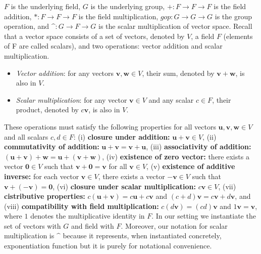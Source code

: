\documentclass[conference,compsoc]{IEEEtran}
\begin{document}
\noindent
 $F$ is the underlying field, $G$ is the underlying group,
 $+ : F \rightarrow F \rightarrow F$ is the field addition,
 $* : F \rightarrow F \rightarrow F$ is the field multiplication, 
 $gop : G \rightarrow G \rightarrow G$ is the group operation, and
 $\mbox{\textasciicircum}: G \rightarrow F \rightarrow G$ is the scalar multiplication of vector space.  
 Recall that a vector space consists of a set of 
 vectors, denoted by \(V\), a field \(F\) (elements of F are called scalars), and 
 two operations: vector addition and scalar multiplication.
\begin{itemize}
    \item \textit{Vector addition}: for any vectors \(\mathbf{v}, \mathbf{w} \in V\), their sum, denoted by \(\mathbf{v} + \mathbf{w}\), is also in \(V\).
    \item \textit{Scalar multiplication}: for any vector \(\mathbf{v} \in V\) and any scalar \(c \in F\), their product, denoted by \(c\mathbf{v}\), is also in \(V\).
\end{itemize}

These operations must satisfy the following properties for all vectors \(\mathbf{u}, \mathbf{v}, \mathbf{w} \in V\) and all scalars \(c, d \in F\):
(i) \textbf{closure under addition:} \(\mathbf{u} + \mathbf{v} \in V\), (ii) \textbf{commutativity of addition:} \(\mathbf{u} + \mathbf{v} = \mathbf{v} + \mathbf{u}\), 
(iii)  \textbf{associativity of addition:} \((\mathbf{u} + \mathbf{v}) + \mathbf{w} = \mathbf{u} + (\mathbf{v} + \mathbf{w})\), 
(iv) \textbf{existence of zero vector:} there exists a vector \(\mathbf{0} \in V\) such that \(\mathbf{v} + \mathbf{0} = \mathbf{v}\) for all \(\mathbf{v} \in V\), 
(v) \textbf{existence of additive inverse:} for each vector \(\mathbf{v} \in V\), there exists a vector \(-\mathbf{v} \in V\) such that \(\mathbf{v} + (-\mathbf{v}) = \mathbf{0}\),
(vi) \textbf{closure under scalar multiplication:} \(c\mathbf{v} \in V\), 
(vii) \textbf{cistributive properties:} \(c(\mathbf{u} + \mathbf{v}) = c\mathbf{u} + c\mathbf{v}\) and \((c + d)\mathbf{v} = c\mathbf{v} + d\mathbf{v}\), 
and (viii) \textbf{compatibility with field multiplication:} \(c(d\mathbf{v}) = (cd)\mathbf{v}\) and \(1\mathbf{v} = \mathbf{v}\), where \(1\) denotes the multiplicative identity in \(F\).
In our setting we instantiate the set of vectors with $G$ and field with $F$. 
Moreover, our notation for scalar multiplication is $\mbox{\textasciicircum}$ because it represents, 
when instantiated concretely, exponentiation function but it is purely for notational convenience. 
\end{document}
